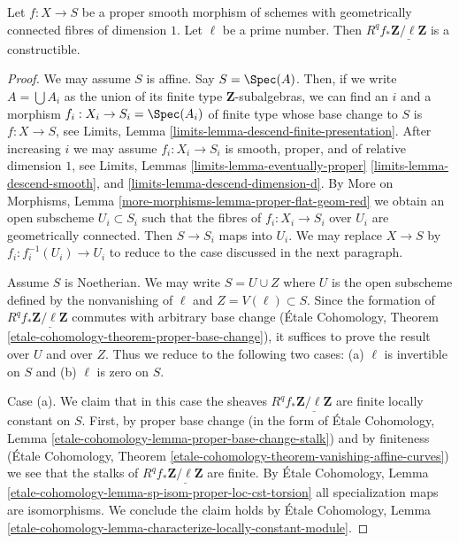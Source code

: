 \begin{lemma}
\label{lemma-proper-smooth-family-curves}
Let $f : X \to S$ be a proper smooth morphism of schemes with
geometrically connected fibres of dimension $1$. Let $\ell$
be a prime number. Then $R^qf_*\underline{\mathbf{Z}/\ell\mathbf{Z}}$
is a constructible.
\end{lemma}

\begin{proof}
We may assume $S$ is affine. Say $S = \Spec(A)$. Then, if we write
$A = \bigcup A_i$ as the union of its finite type $\mathbf{Z}$-subalgebras,
we can find an $i$ and a morphism $f_i : X_i \to S_i = \Spec(A_i)$ of finite
type whose base change to $S$ is $f : X \to S$, see
Limits, Lemma \ref{limits-lemma-descend-finite-presentation}.
After increasing $i$ we may assume $f_i : X_i \to S_i$ is
smooth, proper, and of relative dimension $1$, see
Limits, Lemmas
\ref{limits-lemma-eventually-proper}
\ref{limits-lemma-descend-smooth}, and
\ref{limits-lemma-descend-dimension-d}.
By More on Morphisms, Lemma \ref{more-morphisms-lemma-proper-flat-geom-red}
we obtain an open subscheme $U_i \subset S_i$ such that the fibres
of $f_i : X_i \to S_i$ over $U_i$ are geometrically connected.
Then $S \to S_i$ maps into $U_i$. We may replace $X \to S$
by $f_i : f_i^{-1}(U_i) \to U_i$ to reduce to the case
discussed in the next paragraph.

\medskip\noindent
Assume $S$ is Noetherian. We may write $S = U \cup Z$ where $U$ is the
open subscheme defined by the nonvanishing of $\ell$ and
$Z = V(\ell) \subset S$. Since the formation of
$R^qf_*\underline{\mathbf{Z}/\ell\mathbf{Z}}$ commutes with arbitrary
base change (\'Etale Cohomology, Theorem
\ref{etale-cohomology-theorem-proper-base-change}),
it suffices to prove the result over $U$ and over $Z$.
Thus we reduce to the following two cases: (a) $\ell$
is invertible on $S$ and (b) $\ell$ is zero on $S$.

\medskip\noindent
Case (a). We claim that in this case the sheaves
$R^qf_*\underline{\mathbf{Z}/\ell\mathbf{Z}}$ are
finite locally constant on $S$. First, by proper base change
(in the form of \'Etale Cohomology, Lemma
\ref{etale-cohomology-lemma-proper-base-change-stalk})
and by finiteness 
(\'Etale Cohomology, Theorem
\ref{etale-cohomology-theorem-vanishing-affine-curves})
we see that the stalks of $R^qf_*\underline{\mathbf{Z}/\ell\mathbf{Z}}$
are finite. By \'Etale Cohomology, Lemma
\ref{etale-cohomology-lemma-sp-isom-proper-loc-cst-torsion}
all specialization maps are isomorphisms.
We conclude the claim holds by
\'Etale Cohomology, Lemma
\ref{etale-cohomology-lemma-characterize-locally-constant-module}.


\end{proof}
